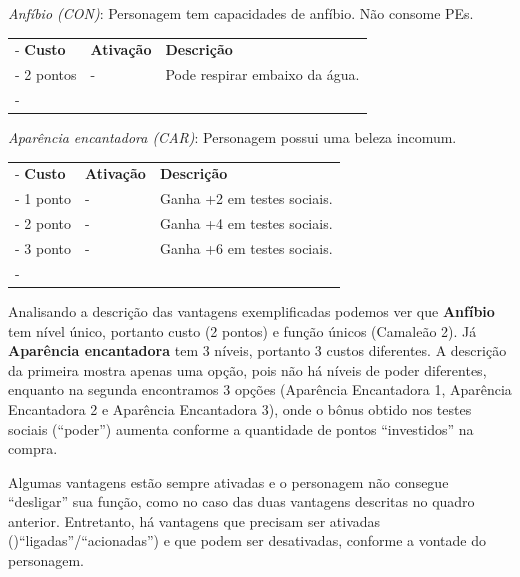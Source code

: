 \begin{framed}
	\begin{minipage}[t]{.95\textwidth}
\begin{small}
	\emph{Anfíbio (CON)}: Personagem tem capacidades de anfíbio. Não consome PEs. \\
	\begin{tabu}{|X[c]|X[c]|X[3]|} \tabucline-
		\textbf{Custo} 			& \textbf{Ativação}		&	\textbf{Descrição} \\ \tabucline-
		2 pontos			&		- 				&	Pode respirar embaixo da água. \\ \tabucline-
	\end{tabu}
	\vspace{5mm}
	\emph{Aparência encantadora (CAR)}: Personagem possui uma beleza incomum. \\
	\begin{tabu}{|X[c]|X[c]|X[3]|} \tabucline-
		\textbf{Custo} 	& \textbf{Ativação}	&	\textbf{Descrição} \\ \tabucline-
		1 ponto					&	- 							&	Ganha +2 em testes sociais. \\ \tabucline-
		2 ponto					&	-							&	Ganha +4 em testes sociais. \\ \tabucline-
		3 ponto					&	-							&	Ganha +6 em testes sociais. \\ \tabucline-
	\end{tabu}
\end{small}
	\end{minipage}
\end{framed}

Analisando a descrição das vantagens exemplificadas podemos ver que \textbf{Anfíbio} tem nível único, portanto custo (2 pontos) e função únicos (Camaleão 2). Já  \textbf{Aparência encantadora} tem 3 níveis, portanto 3 custos diferentes. A descrição da primeira mostra apenas uma opção, pois não há níveis de poder diferentes, enquanto na segunda encontramos 3 opções (Aparência Encantadora 1, Aparência Encantadora 2 e Aparência Encantadora 3), onde o bônus obtido nos testes sociais (``poder'') aumenta conforme a quantidade de pontos ``investidos'' na compra. 

Algumas vantagens estão sempre ativadas e o personagem não consegue ``desligar'' sua função, como no caso das duas vantagens descritas no quadro anterior. Entretanto, há vantagens que precisam ser ativadas ()``ligadas''/``acionadas'') e que podem ser desativadas, conforme a vontade do personagem. 

